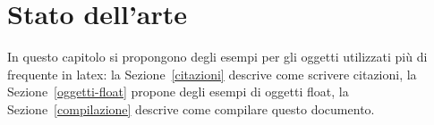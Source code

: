 \chapter{Stato dell'arte}
\label{statodellarte}

In questo capitolo si propongono degli esempi per gli oggetti utilizzati più di frequente in latex: la Sezione~\ref{citazioni} descrive come scrivere citazioni, la Sezione~\ref{oggetti-float} propone degli esempi di oggetti float, la Sezione~\ref{compilazione} descrive come compilare questo documento.

%
%
%
%
%
%
%
%
%
